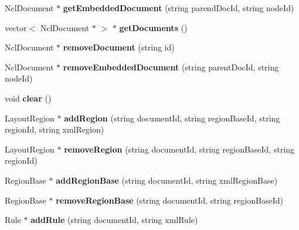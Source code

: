 \begin{CompactItemize}
\item 
NclDocument $\ast$ \textbf{getEmbeddedDocument} (string parendDocId, string nodeId)\label{classbr_1_1pucrio_1_1telemidia_1_1ginga_1_1ncl_1_1PrivateBaseContext_685036ae629e9f56b9bf168da4da8740}

\item 
vector$<$ NclDocument $\ast$ $>$ $\ast$ \textbf{getDocuments} ()\label{classbr_1_1pucrio_1_1telemidia_1_1ginga_1_1ncl_1_1PrivateBaseContext_7c823ae3648cf529edf492ba1935cdb4}

\item 
NclDocument $\ast$ \textbf{removeDocument} (string id)\label{classbr_1_1pucrio_1_1telemidia_1_1ginga_1_1ncl_1_1PrivateBaseContext_abe8b34d24f1d51e3bb0a4a93c280b00}

\item 
NclDocument $\ast$ \textbf{removeEmbeddedDocument} (string parentDocId, string nodeId)\label{classbr_1_1pucrio_1_1telemidia_1_1ginga_1_1ncl_1_1PrivateBaseContext_e109c9d0d3a6c040febae1268ef86336}

\item 
void \textbf{clear} ()\label{classbr_1_1pucrio_1_1telemidia_1_1ginga_1_1ncl_1_1PrivateBaseContext_c8bb3912a3ce86b15842e79d0b421204}

\item 
LayoutRegion $\ast$ \textbf{addRegion} (string documentId, string regionBaseId, string regionId, string xmlRegion)\label{classbr_1_1pucrio_1_1telemidia_1_1ginga_1_1ncl_1_1PrivateBaseContext_45200d403e40ab0e38040063ce76cfc8}

\item 
LayoutRegion $\ast$ \textbf{removeRegion} (string documentId, string regionBaseId, string regionId)\label{classbr_1_1pucrio_1_1telemidia_1_1ginga_1_1ncl_1_1PrivateBaseContext_961c5e8fd2a9d9109d8042a5f0c96c5d}

\item 
RegionBase $\ast$ \textbf{addRegionBase} (string documentId, string xmlRegionBase)\label{classbr_1_1pucrio_1_1telemidia_1_1ginga_1_1ncl_1_1PrivateBaseContext_933903847ac6104c8c9f3d0593702e09}

\item 
RegionBase $\ast$ \textbf{removeRegionBase} (string documentId, string regionBaseId)\label{classbr_1_1pucrio_1_1telemidia_1_1ginga_1_1ncl_1_1PrivateBaseContext_40009c2361c7b8102bd01717e2237f2a}

\item 
Rule $\ast$ \textbf{addRule} (string documentId, string xmlRule)\label{classbr_1_1pucrio_1_1telemidia_1_1ginga_1_1ncl_1_1PrivateBaseContext_0053a0bc9270d05c905d60f9f7541102}


\end{CompactItemize}
